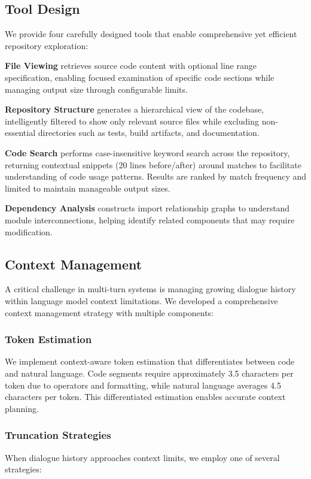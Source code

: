 \documentclass[11pt]{article}
\begin{document}
\subsection{Tool Design}

We provide four carefully designed tools that enable comprehensive yet efficient repository exploration:

\textbf{File Viewing} retrieves source code content with optional line range specification, enabling focused examination of specific code sections while managing output size through configurable limits.

\textbf{Repository Structure} generates a hierarchical view of the codebase, intelligently filtered to show only relevant source files while excluding non-essential directories such as tests, build artifacts, and documentation.

\textbf{Code Search} performs case-insensitive keyword search across the repository, returning contextual snippets (20 lines before/after) around matches to facilitate understanding of code usage patterns. Results are ranked by match frequency and limited to maintain manageable output sizes.

\textbf{Dependency Analysis} constructs import relationship graphs to understand module interconnections, helping identify related components that may require modification.

\subsection{Context Management}

A critical challenge in multi-turn systems is managing growing dialogue history within language model context limitations. We developed a comprehensive context management strategy with multiple components:

\subsubsection{Token Estimation}
We implement context-aware token estimation that differentiates between code and natural language. Code segments require approximately 3.5 characters per token due to operators and formatting, while natural language averages 4.5 characters per token. This differentiated estimation enables accurate context planning.

\subsubsection{Truncation Strategies}
When dialogue history approaches context limits, we employ one of several strategies:
\end{document}
